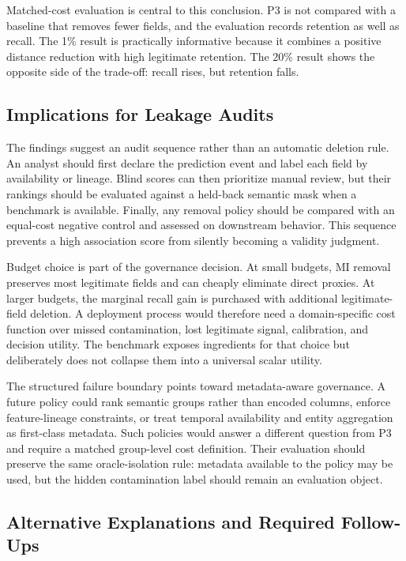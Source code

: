 \documentclass[sigconf,review]{acmart}
\begin{document}
Matched-cost evaluation is central to this conclusion. P3 is not compared with
a baseline that removes fewer fields, and the evaluation records retention as
well as recall. The 1\% result is practically informative because it combines a
positive distance reduction with high legitimate retention. The 20\% result
shows the opposite side of the trade-off: recall rises, but retention falls.

\subsection{Implications for Leakage Audits}

The findings suggest an audit sequence rather than an automatic deletion rule.
An analyst should first declare the prediction event and label each field by
availability or lineage. Blind scores can then prioritize manual review, but
their rankings should be evaluated against a held-back semantic mask when a
benchmark is available. Finally, any removal policy should be compared with an
equal-cost negative control and assessed on downstream behavior. This sequence
prevents a high association score from silently becoming a validity judgment.

Budget choice is part of the governance decision. At small budgets, MI removal
preserves most legitimate fields and can cheaply eliminate direct proxies. At
larger budgets, the marginal recall gain is purchased with additional
legitimate-field deletion. A deployment process would therefore need a
domain-specific cost function over missed contamination, lost legitimate
signal, calibration, and decision utility. The benchmark exposes ingredients
for that choice but deliberately does not collapse them into a universal scalar
utility.

The structured failure boundary points toward metadata-aware governance. A
future policy could rank semantic groups rather than encoded columns, enforce
feature-lineage constraints, or treat temporal availability and entity
aggregation as first-class metadata. Such policies would answer a different
question from P3 and require a matched group-level cost definition. Their
evaluation should preserve the same oracle-isolation rule: metadata available
to the policy may be used, but the hidden contamination label should remain an
evaluation object.

\subsection{Alternative Explanations and Required Follow-Ups}
\end{document}
